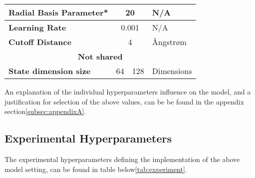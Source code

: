 \begin{table}[H]
\begin{tabular}{|lcll|}
        \multicolumn{1}{|l|}{\textbf{Radial Basis Parameter*}}               & \multicolumn{2}{c|}{20}                       & N/A                                                                     \\ \hline
        \multicolumn{1}{|l|}{\textbf{Learning Rate}}                         & \multicolumn{2}{c|}{0.001}                    & N/A                                                                     \\ \hline
        \multicolumn{1}{|l|}{\textbf{Cutoff Distance}}                       & \multicolumn{2}{c|}{4}                        & Ångstrøm                                                                \\ \hline
        \multicolumn{4}{|c|}{\textbf{Not shared}}                                                                                                                                                      \\ \hline
        \multicolumn{1}{|l|}{\textbf{State dimension size}}                  & \multicolumn{1}{c|}{64}                       & \multicolumn{1}{c|}{128}                       & Dimensions             \\ \hline
    \end{tabular}
\end{table}

An explanation of the individual hyperparameters influence on the model, and a justification for selection of the above values, can be
be found in the appendix section\ref{subsec:appendixA}.

\subsection{Experimental Hyperparameters}\label{subsec:experiement}

The experimental hyperparameters defining the implementation of the above model setting, can be found in
table below\ref{tab:experiment}.

